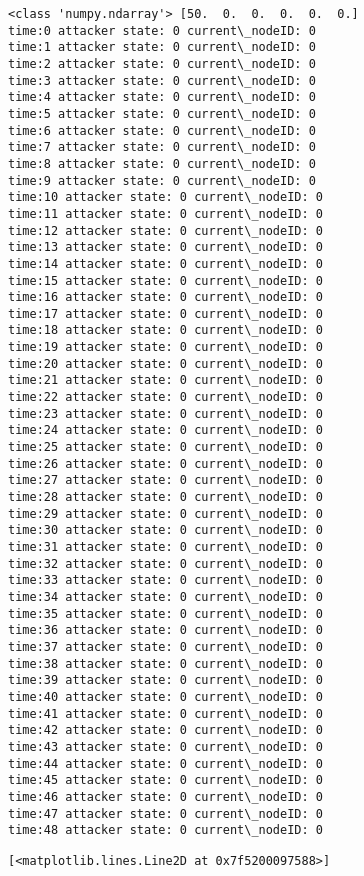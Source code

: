 \documentclass[11pt]{article}
\makeatletter
\newcommand{\boxspacing}{\kern\kvtcb@left@rule\kern\kvtcb@boxsep}
\newcommand{\prompt}[4]{
        \ttfamily\llap{{\color{#2}[#3]:\hspace{3pt}#4}}\vspace{-\baselineskip}
    }
\makeatother
\begin{document}
    \begin{Verbatim}[commandchars=\\\{\}]
<class 'numpy.ndarray'> [50.  0.  0.  0.  0.  0.]
time:0 attacker state: 0 current\_nodeID: 0
time:1 attacker state: 0 current\_nodeID: 0
time:2 attacker state: 0 current\_nodeID: 0
time:3 attacker state: 0 current\_nodeID: 0
time:4 attacker state: 0 current\_nodeID: 0
time:5 attacker state: 0 current\_nodeID: 0
time:6 attacker state: 0 current\_nodeID: 0
time:7 attacker state: 0 current\_nodeID: 0
time:8 attacker state: 0 current\_nodeID: 0
time:9 attacker state: 0 current\_nodeID: 0
time:10 attacker state: 0 current\_nodeID: 0
time:11 attacker state: 0 current\_nodeID: 0
time:12 attacker state: 0 current\_nodeID: 0
time:13 attacker state: 0 current\_nodeID: 0
time:14 attacker state: 0 current\_nodeID: 0
time:15 attacker state: 0 current\_nodeID: 0
time:16 attacker state: 0 current\_nodeID: 0
time:17 attacker state: 0 current\_nodeID: 0
time:18 attacker state: 0 current\_nodeID: 0
time:19 attacker state: 0 current\_nodeID: 0
time:20 attacker state: 0 current\_nodeID: 0
time:21 attacker state: 0 current\_nodeID: 0
time:22 attacker state: 0 current\_nodeID: 0
time:23 attacker state: 0 current\_nodeID: 0
time:24 attacker state: 0 current\_nodeID: 0
time:25 attacker state: 0 current\_nodeID: 0
time:26 attacker state: 0 current\_nodeID: 0
time:27 attacker state: 0 current\_nodeID: 0
time:28 attacker state: 0 current\_nodeID: 0
time:29 attacker state: 0 current\_nodeID: 0
time:30 attacker state: 0 current\_nodeID: 0
time:31 attacker state: 0 current\_nodeID: 0
time:32 attacker state: 0 current\_nodeID: 0
time:33 attacker state: 0 current\_nodeID: 0
time:34 attacker state: 0 current\_nodeID: 0
time:35 attacker state: 0 current\_nodeID: 0
time:36 attacker state: 0 current\_nodeID: 0
time:37 attacker state: 0 current\_nodeID: 0
time:38 attacker state: 0 current\_nodeID: 0
time:39 attacker state: 0 current\_nodeID: 0
time:40 attacker state: 0 current\_nodeID: 0
time:41 attacker state: 0 current\_nodeID: 0
time:42 attacker state: 0 current\_nodeID: 0
time:43 attacker state: 0 current\_nodeID: 0
time:44 attacker state: 0 current\_nodeID: 0
time:45 attacker state: 0 current\_nodeID: 0
time:46 attacker state: 0 current\_nodeID: 0
time:47 attacker state: 0 current\_nodeID: 0
time:48 attacker state: 0 current\_nodeID: 0
    \end{Verbatim}

            \begin{tcolorbox}[breakable, size=fbox, boxrule=.5pt, pad at break*=1mm, opacityfill=0]
\prompt{Out}{outcolor}{133}{\boxspacing}
\begin{Verbatim}[commandchars=\\\{\}]
[<matplotlib.lines.Line2D at 0x7f5200097588>]
\end{Verbatim}
\end{tcolorbox}
        
\end{document}
